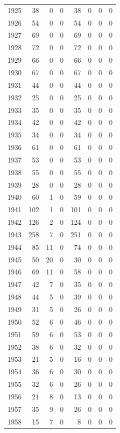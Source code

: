 \documentclass[
]{scrartcl}
\begin{document}
\begin{longtable}[t]{rrrrrrrr}
1925 & 38 & 0 & 0 & 38 & 0 & 0 & 0\\
1926 & 54 & 0 & 0 & 54 & 0 & 0 & 0\\
1927 & 69 & 0 & 0 & 69 & 0 & 0 & 0\\
1928 & 72 & 0 & 0 & 72 & 0 & 0 & 0\\
1929 & 66 & 0 & 0 & 66 & 0 & 0 & 0\\
1930 & 67 & 0 & 0 & 67 & 0 & 0 & 0\\
1931 & 44 & 0 & 0 & 44 & 0 & 0 & 0\\
1932 & 25 & 0 & 0 & 25 & 0 & 0 & 0\\
1933 & 35 & 0 & 0 & 35 & 0 & 0 & 0\\
1934 & 42 & 0 & 0 & 42 & 0 & 0 & 0\\
1935 & 34 & 0 & 0 & 34 & 0 & 0 & 0\\
1936 & 61 & 0 & 0 & 61 & 0 & 0 & 0\\
1937 & 53 & 0 & 0 & 53 & 0 & 0 & 0\\
1938 & 55 & 0 & 0 & 55 & 0 & 0 & 0\\
1939 & 28 & 0 & 0 & 28 & 0 & 0 & 0\\
1940 & 60 & 1 & 0 & 59 & 0 & 0 & 0\\
1941 & 102 & 1 & 0 & 101 & 0 & 0 & 0\\
1942 & 126 & 2 & 0 & 124 & 0 & 0 & 0\\
1943 & 258 & 7 & 0 & 251 & 0 & 0 & 0\\
1944 & 85 & 11 & 0 & 74 & 0 & 0 & 0\\
1945 & 50 & 20 & 0 & 30 & 0 & 0 & 0\\
1946 & 69 & 11 & 0 & 58 & 0 & 0 & 0\\
1947 & 42 & 7 & 0 & 35 & 0 & 0 & 0\\
1948 & 44 & 5 & 0 & 39 & 0 & 0 & 0\\
1949 & 31 & 5 & 0 & 26 & 0 & 0 & 0\\
1950 & 52 & 6 & 0 & 46 & 0 & 0 & 0\\
1951 & 59 & 6 & 0 & 53 & 0 & 0 & 0\\
1952 & 38 & 6 & 0 & 32 & 0 & 0 & 0\\
1953 & 21 & 5 & 0 & 16 & 0 & 0 & 0\\
1954 & 36 & 6 & 0 & 30 & 0 & 0 & 0\\
1955 & 32 & 6 & 0 & 26 & 0 & 0 & 0\\
1956 & 21 & 8 & 0 & 13 & 0 & 0 & 0\\
1957 & 35 & 9 & 0 & 26 & 0 & 0 & 0\\
1958 & 15 & 7 & 0 & 8 & 0 & 0 & 0\\

\end{longtable}
\end{document}
